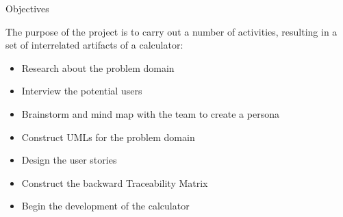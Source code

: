 \documentclass[final]{beamer}
\newlength{\onecolwid}
\begin{document}
\begin{frame}
\begin{columns}[t]
\begin{column}{\onecolwid}
\begin{exampleblock}{Objectives}

The purpose of the project is to carry out a number of activities, resulting in a set of interrelated artifacts of a calculator:

\begin{itemize}
\item Research about the problem domain
\item Interview the potential users
\item Brainstorm and mind map with the team to create a persona
\item Construct UMLs for the problem domain
\item Design the user stories
\item Construct the backward Traceability Matrix
\item Begin the development of the calculator
\end{itemize}

\end{exampleblock}


\begin{exampleblock}{}


\end{exampleblock}
\end{column}
\end{columns}
\end{frame}
\end{document}

